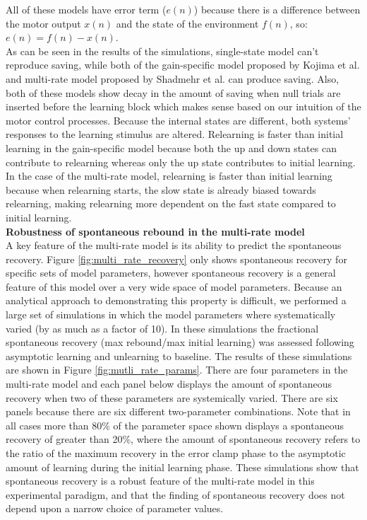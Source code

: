 \documentclass[9pt,twocolumn]{paper-template}
\begin{document}
All of these models have error term ($e(n)$) because there is a difference between the motor output $x(n)$ and the state of the environment $f(n)$, so: $e(n) = f (n) - x(n)$.\\
As can be seen in the results of the simulations, single-state model can't reproduce saving, while both of the gain-specific model proposed by Kojima et al. and multi-rate model proposed by Shadmehr et al. can produce saving. Also, both of these models show decay in the amount of saving when null trials are inserted before the learning block which makes sense based on our intuition of the motor control processes. Because the internal states are different, both systems’ responses to the learning stimulus are altered. Relearning is faster than initial learning in the gain-specific model because both the up and down states can contribute to relearning whereas only the up state contributes to initial learning. In the case of the multi-rate model, relearning is faster than initial learning because when relearning starts, the
slow state is already biased towards relearning, making relearning more dependent on the fast state compared to initial learning.\\



\textbf{Robustness of spontaneous rebound in the multi-rate model}\\
A key feature of the multi-rate model is its ability to predict the spontaneous recovery. Figure \ref{fig:multi_rate_recovery} only shows spontaneous recovery for
specific sets of model parameters, however spontaneous recovery is a general feature of this
model over a very wide space of model parameters. Because an analytical approach to
demonstrating this property is difficult, we performed a large set of simulations in which the
model parameters where systematically varied (by as much as a factor of 10). In these simulations the fractional spontaneous
recovery (max rebound/max initial learning) was assessed following asymptotic learning and
unlearning to baseline. The results of these simulations are shown in Figure \ref{fig:mutli_rate_params}. There are four
parameters in the multi-rate model and each panel below displays the amount of
spontaneous recovery when two of these parameters are systemically varied. There are six
panels because there are six different two-parameter combinations. Note that in all cases
more than 80\% of the parameter space shown displays a spontaneous recovery of greater
than 20\%, where the amount of spontaneous recovery refers to the ratio of the maximum
recovery in the error clamp phase to the asymptotic amount of learning during the initial
learning phase. These simulations show that spontaneous recovery is a robust feature of
the multi-rate model in this experimental paradigm, and that the finding of spontaneous
recovery does not depend upon a narrow choice of parameter values.\\
\end{document}
